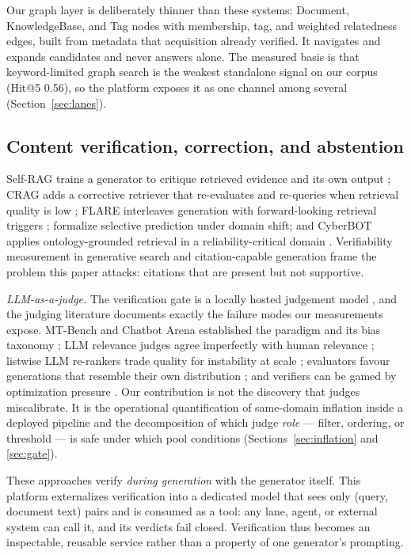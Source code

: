 Our graph layer is deliberately thinner than these systems: Document,
KnowledgeBase, and Tag nodes with membership, tag, and weighted relatedness
edges, built from metadata that acquisition already verified. It navigates and
expands candidates and never answers alone. The measured basis is that
keyword-limited graph search is the weakest standalone signal on our corpus
(Hit@5 0.56), so the platform exposes it as one channel among several
(Section~\ref{sec:lanes}).

\subsection{Content verification, correction, and abstention}
Self-RAG trains a generator to critique retrieved evidence and its own output
\citep{selfrag}; CRAG adds a corrective retriever that re-evaluates and
re-queries when retrieval quality is low \citep{crag}; FLARE interleaves
generation with forward-looking retrieval triggers \citep{flare};
\citet{kamath} formalize selective prediction under domain shift; and CyberBOT
applies ontology-grounded retrieval in a reliability-critical domain
\citep{cyberbot}. Verifiability measurement in generative search
\citep{liu-verifiability} and citation-capable generation \citep{gao-citations}
frame the problem this paper attacks: citations that are present but not
supportive.

\emph{LLM-as-a-judge.} The verification gate is a locally hosted judgement
model \citep{laya}, and the judging literature documents exactly the failure
modes our measurements expose. MT-Bench and Chatbot Arena established the
paradigm and its bias taxonomy \citep{zheng-llmjudge}; LLM relevance judges
agree imperfectly with human relevance \citep{sun-urara}; listwise LLM
re-rankers trade quality for instability at scale \citep{rankgpt}; evaluators
favour generations that resemble their own distribution
\citep{panickssery-selfpref}; and verifiers can be gamed by optimization
pressure \citep{lightman-verify}. Our contribution is not the discovery that
judges miscalibrate. It is the operational quantification of same-domain
inflation inside a deployed pipeline and the decomposition of which judge
\emph{role} --- filter, ordering, or threshold --- is safe under which pool
conditions (Sections~\ref{sec:inflation} and \ref{sec:gate}).

These approaches verify \emph{during generation} with the generator itself.
This platform externalizes verification into a dedicated model that sees only
(query, document text) pairs and is consumed as a tool: any lane, agent, or
external system can call it, and its verdicts fail closed. Verification thus
becomes an inspectable, reusable service rather than a property of one
generator's prompting.

